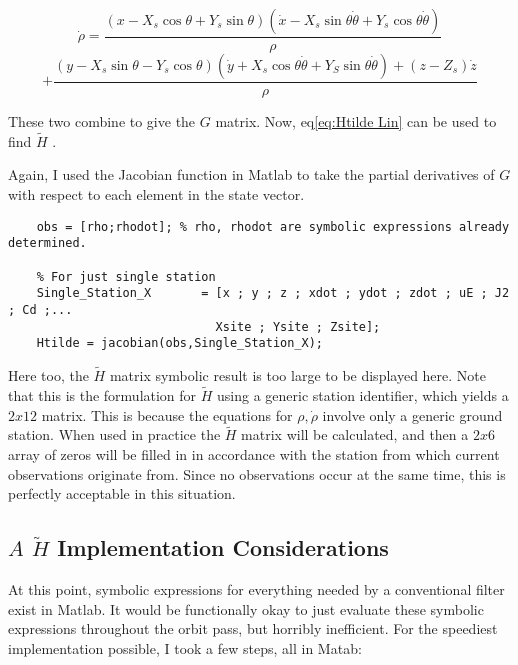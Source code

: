 \documentclass[12pt,a4paper,oneside]{article}
\numberwithin{equation}{section}   		%
\newcommand{\parens} [1] {\left(  #1  \right)}
\begin{document}
\begin{displaymath}
	\dot{\rho} = \frac{\parens{x-X_s\cos{\theta} + Y_s\sin{\theta}}\parens{\dot{x}-X_s\sin{\theta}\dot{\theta} + Y_s\cos{\theta}\dot{\theta}}}{\rho} 
\end{displaymath}
\begin{equation}
	+  \frac{\parens{y - X_s\sin{\theta}	-Y_s\cos{\theta}}\parens{\dot{y} + X_s\cos{\theta}\dot{\theta} + Y_S\sin{\theta}\dot{\theta}} + \parens{z-Z_s}\dot{z}}{\rho}
	\label{eq:rhodot}
\end{equation}


 These two combine to give  the $G$ matrix. Now, eq\eqref{eq:Htilde Lin} can be used to find $\tilde{H}$ .

Again, I used the Jacobian function in Matlab to take the partial derivatives of $G$ with respect to each element in the state vector.

\begin{lstlisting}
	obs = [rho;rhodot]; % rho, rhodot are symbolic expressions already determined. 

	% For just single station
	Single_Station_X       = [x ; y ; z ; xdot ; ydot ; zdot ; uE ; J2 ; Cd ;...
							 Xsite ; Ysite ; Zsite];
	Htilde = jacobian(obs,Single_Station_X);
\end{lstlisting}

Here too, the $\tilde{H}$ matrix symbolic result is too large to be displayed here. Note that this is the formulation for $\tilde{H}$ using a generic station identifier, which yields a $2x12$ matrix. This is because the equations for $\rho,\dot{\rho}$ involve only a generic ground station. When used in practice the $\tilde{H}$ matrix will be calculated, and then a $2x6$ array of zeros will be filled in in accordance with the station from which current observations originate from. Since no observations occur at the same time, this is perfectly acceptable in this situation. 


\subsection{$A$ $\tilde{H}$ Implementation Considerations}
\label{sec:A Htilde Implementation}
At this point, symbolic expressions for everything needed by a conventional filter exist in Matlab. It would be functionally okay to just evaluate these symbolic expressions throughout the orbit pass, but horribly inefficient. For the speediest implementation possible, I took a few steps, all in Matab:
\end{document}
